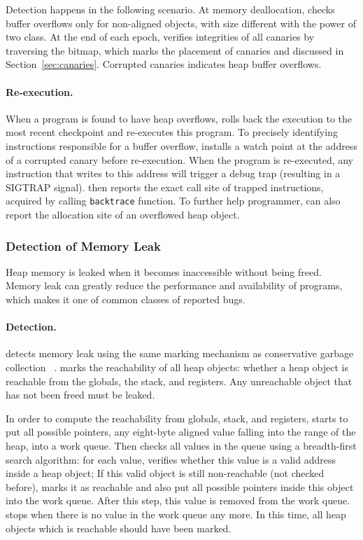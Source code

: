 Detection happens in the following scenario. At memory deallocation, \doubletake{} checks buffer overflows only for non-aligned objects, with size different with the power of two class. At the end of each epoch, \doubletake{} verifies integrities of all canaries by traversing the bitmap, which marks the placement of canaries and discussed in Section~\ref{sec:canaries}.  Corrupted canaries indicates heap buffer overflows. 

\paragraph{Re-execution.}
\label{sec:overflowreport}
When a program is found to have heap overflows, \doubletake{} rolls back the execution to the most recent checkpoint and re-executes this program.
To precisely identifying instructions responsible for a buffer overflow, \doubletake{} installs a watch point at the address of a corrupted canary before re-execution. When the program is re-executed, any instruction that writes to this address will trigger a debug trap (resulting in a SIGTRAP signal). \doubletake{} then reports the exact call site of trapped instructions, acquired by calling \texttt{backtrace} function. To further help programmer, \doubletake{} can also report the allocation site of an overflowed heap object. 
  
\subsubsection{Detection of Memory Leak}
\label{sec:leak}
Heap memory is leaked when it becomes inaccessible without being freed. Memory leak can greatly reduce the performance and availability of programs, which makes it one of common classes of reported bugs.

\paragraph{Detection.}
\doubletake{} detects memory leak using the same marking mechanism as conservative garbage collection ~\cite{Wilson:1992:UGC:645648.664824}. \doubletake{} marks the reachability of all heap objects: whether a heap object is reachable from the globals, the stack, and registers. Any unreachable object that has not been freed must be leaked. 

In order to compute the reachability from globals, stack, and registers, \doubletake{} starts to put all possible pointers, any eight-byte aligned value falling into the range of the heap, into a work queue. Then \doubletake{} checks all values in the queue using a breadth-first search algorithm: for each value, \doubletake{} verifies whether this value is a valid address inside a heap object; If this valid object is still non-reachable (not checked before), \doubletake{} marks it as reachable and also put all possible pointers inside this object into the work queue. After this step, this value is removed from the work queue. \doubletake{} stops when there is no value in the work queue any more. In this time, all heap objects which is reachable should have been marked. 

